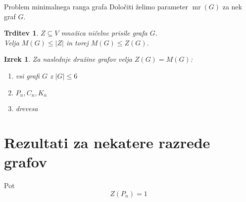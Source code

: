 \documentclass{beamer}
\newtheorem{trditev}[theorem]{Trditev}
\newtheorem{izrek}[theorem]{Izrek}
\DeclareMathOperator{\mr}{mr}
\begin{document}
\begin{frame}
    \begin{block}{Problem minimalnega ranga grafa}
        Določiti želimo parameter $\mr(G)$ za nek graf $G$.
    \end{block}
    
    \begin{trditev}
        $Z \subseteq V$ množica ničelne prisile grafa $G$. \\ 
        Velja $M(G) \leq |Z|$ in torej $M(G) \leq Z(G)$.
    \end{trditev}

    \begin{izrek}
        Za naslednje družine grafov velja $Z(G) = M(G)$:
        \begin{enumerate}
            \item vsi grafi $G$ z $|G| \leq 6$
            \item $P_n, C_n, K_n$
            \item drevesa
        \end{enumerate}
    \end{izrek}
\end{frame}


\section{Rezultati za nekatere razrede grafov}

\begin{frame}{Pot}
    \[ Z(P_n) = 1 \]
    \begin{figure}
        \centering
    \end{figure}
\end{frame}
\end{document}
